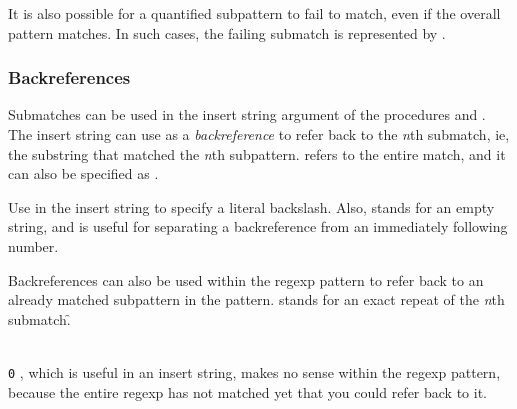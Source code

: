 {It is also possible for a quantified subpattern to
fail to match, even if the overall pattern matches.
In such cases, the failing submatch is represented
by .


\subsubsection{Backreferences}

Submatches can be used in the insert string argument of
the procedures  and
.  The insert string can use \p{\n}
as a {\em backreference} to refer back to the {\em n}th
submatch, ie, the substring that matched the {\em n}th
subpattern.   \p{\0} refers to the entire match,
and it can also be specified as \p{\&}.


Use \p{\\} in the insert string to specify a literal
backslash.  Also, \p{\$} stands for an empty string,
and is useful for separating a backreference \p{\n}
from an immediately following number.

Backreferences can also be used within the regexp
pattern to refer back to an already matched subpattern
in the pattern.  \p{\n} stands for an exact repeat
of the {\em n}th submatch.\f{\ifx\newenvironment\PLAINTEX
\p{\0}\else
{\tt\\0}\fi
, which is useful in
an insert string, makes no  sense within the regexp
pattern, because the entire regexp has not matched yet
that you could refer back to it.}

}
